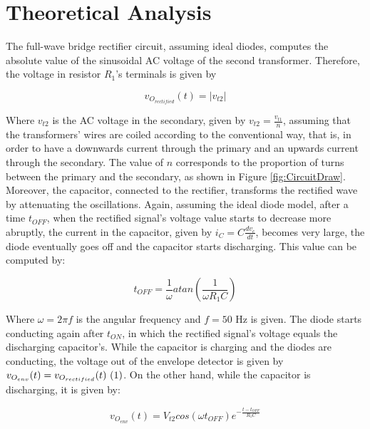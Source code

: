 \section{Theoretical Analysis} \label{sec:analysis}

The full-wave bridge rectifier circuit, assuming ideal diodes, computes the absolute value of the sinusoidal AC voltage of the second transformer. Therefore, the voltage in resistor $R_1$'s terminals is given by

\begin{equation} \label{eq:rectified_voltage}
  v_{O_{rectified}}(t)=|v_{t2}|
\end{equation}

Where $v_{t2}$ is the AC voltage in the secondary, given by $v_{t2}=\frac{v_{t1}}{n}$, assuming that the transformers' wires are coiled according to the conventional way, that is, in order to have a downwards current through the primary and an upwards current through the secondary. The value of $n$ corresponds to the proportion of turns between the primary and the secondary, as shown in Figure \ref{fig:CircuitDraw}. Moreover, the capacitor, connected to the rectifier, transforms the rectified wave by attenuating the oscillations. Again, assuming the ideal diode model, after a time $t_{OFF}$, when the rectified signal's voltage value starts to decrease more abruptly, the current in the capacitor, given by $i_C=C\frac{dv_c}{dt}$, becomes very large, the diode eventually goes off and the capacitor starts discharging. This value can be computed by:

\begin{equation} \label{eq:toff}
  t_{OFF}=\frac{1}{\omega}atan\left(\frac{1}{\omega R_1C}\right)
\end{equation}

Where $\omega=2\pi f$ is the angular frequency and $f=50$ Hz is given. The diode starts conducting again after $t_{ON}$, in which the rectified signal's voltage equals the discharging capacitor's. While the capacitor is charging and the diodes are conducting, the voltage out of the envelope detector is given by $v_{O_{env}}(t)=v_{O_{rectified}}(t)~\refstepcounter{equation}(\theequation)\label{eq:envelopesameasrectified}$. On the other hand, while the capacitor is discharging, it is given by:

\begin{equation} \label{eq:exponential_voltage}
  v_{O_{env}}(t)=V_{t2}cos(\omega t_{OFF})e^{-\frac{t-t_{OFF}}{R_1C}}
\end{equation}

